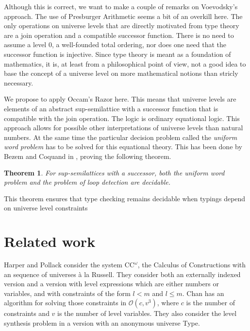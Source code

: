 \documentclass[11pt,a4paper]{article}
\newtheorem{theorem}{Theorem}[section]
\def\Ordo{\mathcal{O}}
\def\CComega{\mathrm{CC}^\omega}
\begin{document}
Although this is correct, we want to make a couple of remarks on Voevodsky's approach.
The use of Presburger Arithmetic seems a bit of an overkill here.
The only operations on universe levels that are directly motivated
from type theory are a join operation and a compatible successor function.
There is no need to assume a level 0, a well-founded total ordering,
nor does one need that the successor function is injective.
Since type theory is meant as a foundation of mathematics, it is,
at least from a philosophical point of view,
not a good idea to base the concept of a universe level
on more mathematical notions than stricly necessary.

We propose to apply Occam's Razor here. This means that universe levels
are elements of an abstract sup-semilattice with a successor function
that is compatible with the join operation. The logic is ordinary
equational logic.
This approach allows for possible other interpretations of universe levels
than natural numbers. At the same time the particular decision problem
called the \emph{uniform word problem} has to be solved for this equational theory.
This has been done by Bezem and Coquand in \cite{bezem-coquand:lattices},
proving the following theorem.

\begin{theorem}\label{thm:P-solvability}
For sup-semilattices with a successor, both the uniform word problem
and the problem of loop detection are decidable.
\end{theorem}
This theorem ensures that type checking remains decidable when
typings depend on universe level constraints


\section{Related work}

Harper and Pollack \cite{HarperP91} consider the system $\CComega$, the Calculus of Constructions with an sequence of universes \`a la Russell. They consider both an externally indexed version and a version with level expressions which are either numbers or variables, and with constraints of the form $l < m$ and $l \leq m$. Chan has an algorithm for solving those constraints in $\Ordo(c,v^3)$, where $c$ is the number of constraints and $v$ is the number of level variables. They also consider the level synthesis problem in a version with an anonymous universe Type.
\end{document}
